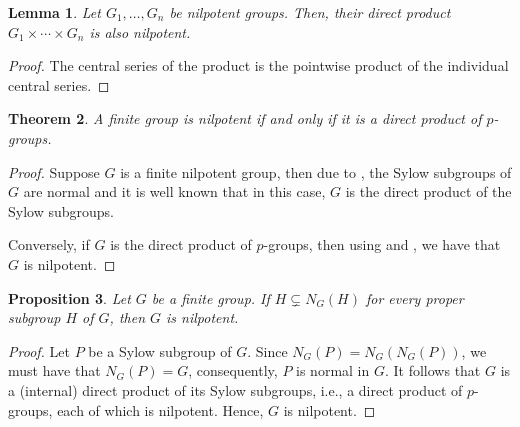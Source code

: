 \documentclass[12pt]{article}
\theoremstyle{thmstyle}
\newtheorem{theorem}{Theorem}[section]
\newtheorem{lemma}[theorem]{Lemma}
\newtheorem{proposition}[theorem]{Proposition}
\theoremstyle{defstyle}
\begin{document}
\begin{lemma}
    Let $G_1,\ldots,G_n$ be nilpotent groups. Then, their direct product $G_1\times\cdots\times G_n$ is also nilpotent.
\end{lemma}
\begin{proof}
    The central series of the product is the pointwise product of the individual central series.
\end{proof}

\begin{theorem}
    A finite group is nilpotent if and only if it is a direct product of $p$-groups.
\end{theorem}
\begin{proof}
    Suppose $G$ is a finite nilpotent group, then due to , the Sylow subgroups of $G$ are normal and it is well known that in this case, $G$ is the direct product of the Sylow subgroups.

    Conversely, if $G$ is the direct product of $p$-groups, then using  and , we have that $G$ is nilpotent.
\end{proof}

\begin{proposition}
    Let $G$ be a finite group. If $H\subsetneq N_G(H)$ for every proper subgroup $H$ of $G$, then $G$ is nilpotent.
\end{proposition}
\begin{proof}
    Let $P$ be a Sylow subgroup of $G$. Since $N_G(P) = N_G(N_G(P))$, we must have that $N_G(P) = G$, consequently, $P$ is normal in $G$. It follows that $G$ is a (internal) direct product of its Sylow subgroups, i.e., a direct product of $p$-groups, each of which is nilpotent. Hence, $G$ is nilpotent.
\end{proof}
\end{document}
